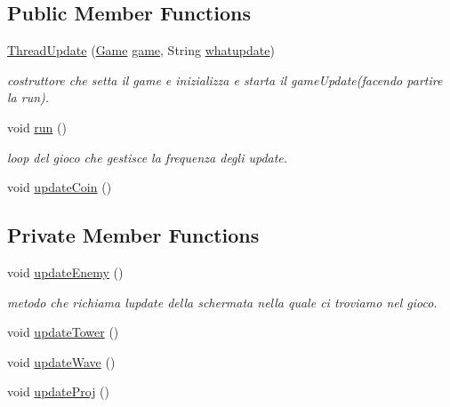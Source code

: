 \subsection*{Public Member Functions}
\begin{DoxyCompactItemize}
\item 
\hyperlink{classprogetto_1_1_thread_update_a1e13ad42d90d11ba28b7f2cb38d6dc53}{Thread\+Update} (\hyperlink{classprogetto_1_1_game}{Game} \hyperlink{classprogetto_1_1_thread_update_ac6a5ed6191fcf3a5bf0445921feb4f48}{game}, String \hyperlink{classprogetto_1_1_thread_update_ae70dd66bad208f0448dbc65cb7d7035f}{whatupdate})
\begin{DoxyCompactList}\small\item\em costruttore che setta il game e inizializza e starta il game\+Update(facendo partire la run). \end{DoxyCompactList}\item 
void \hyperlink{classprogetto_1_1_thread_update_a13a43e6d814de94978c515cb084873b1}{run} ()
\begin{DoxyCompactList}\small\item\em loop del gioco che gestisce la frequenza degli update. \end{DoxyCompactList}\item 
void \hyperlink{classprogetto_1_1_thread_update_a7ca93fcd8c7440e7b3f64c595a5be28c}{update\+Coin} ()
\end{DoxyCompactItemize}
\subsection*{Private Member Functions}
\begin{DoxyCompactItemize}
\item 
void \hyperlink{classprogetto_1_1_thread_update_af005ec68c869a6acd5e833cba9330a50}{update\+Enemy} ()
\begin{DoxyCompactList}\small\item\em metodo che richiama l\textquotesingle{}update della schermata nella quale ci troviamo nel gioco. \end{DoxyCompactList}\item 
void \hyperlink{classprogetto_1_1_thread_update_ae4fd4a959e4d782a5e7ac0eff77ba27f}{update\+Tower} ()
\item 
void \hyperlink{classprogetto_1_1_thread_update_ab424ab29e7ab4733f2efd1e6ef3f13b1}{update\+Wave} ()
\item 
void \hyperlink{classprogetto_1_1_thread_update_ac83c203b559f6fd0bb225744d7ccf854}{update\+Proj} ()
\end{DoxyCompactItemize}
